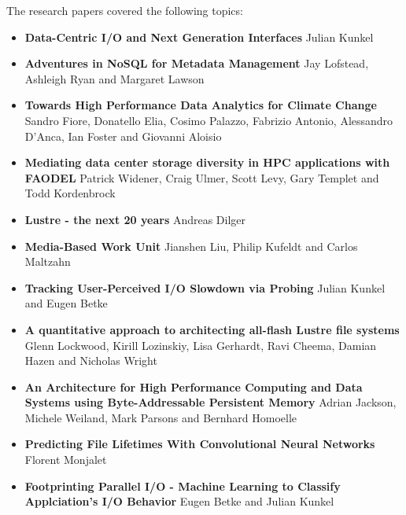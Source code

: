 \documentclass{llncs}
\begin{document}
The research papers covered the following topics:
\begin{itemize}
\item \textbf{Data-Centric I/O and Next Generation Interfaces} Julian Kunkel\\

\item \textbf{Adventures in NoSQL for Metadata Management} Jay Lofstead, Ashleigh Ryan and Margaret Lawson\\

\item \textbf{Towards High Performance Data Analytics for Climate Change} Sandro Fiore, Donatello Elia, Cosimo Palazzo, Fabrizio Antonio, Alessandro D’Anca, Ian Foster and Giovanni Aloisio\\

\item \textbf{Mediating data center storage diversity in HPC applications with FAODEL} Patrick Widener, Craig Ulmer, Scott Levy, Gary Templet and Todd Kordenbrock\\

\item \textbf{Lustre - the next 20 years} Andreas Dilger\\

\item \textbf{Media-Based Work Unit} Jianshen Liu, Philip Kufeldt and Carlos Maltzahn\\

\item \textbf{Tracking User-Perceived I/O Slowdown via Probing} Julian Kunkel and Eugen Betke\\

\item \textbf{A quantitative approach to architecting all-flash Lustre file systems} Glenn Lockwood, Kirill Lozinskiy, Lisa Gerhardt, Ravi Cheema, Damian Hazen and Nicholas Wright\\

\item \textbf{An Architecture for High Performance Computing and Data Systems using Byte-Addressable Persistent Memory} Adrian Jackson, Michele Weiland, Mark Parsons and Bernhard Homoelle\\

\item \textbf{Predicting File Lifetimes With Convolutional Neural Networks} Florent Monjalet\\

\item \textbf{Footprinting Parallel I/O - Machine Learning to Classify Applciation's I/O Behavior} Eugen Betke and Julian Kunkel\\

\end{itemize}
\end{document}
